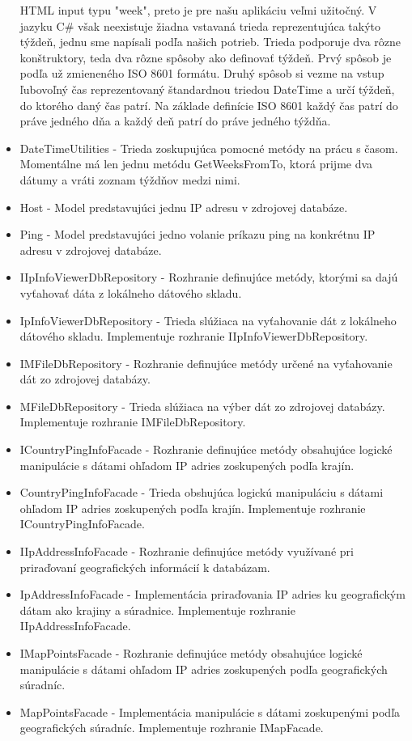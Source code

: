 \begin{itemize}
    HTML input typu "week", preto je pre našu aplikáciu veľmi užitočný. V jazyku C\# však neexistuje žiadna vstavaná trieda reprezentujúca takýto týždeň, jednu sme napísali 
    podľa našich potrieb. Trieda podporuje dva rôzne konštruktory, teda dva rôzne spôsoby ako definovať týždeň. Prvý spôsob je podľa už zmieneného ISO 8601 formátu. Druhý spôsob 
    si vezme na vstup ľubovoľný čas reprezentovaný štandardnou triedou DateTime a určí týždeň, do ktorého daný čas patrí. Na základe definície ISO 8601 každý čas patrí do práve jedného 
    dňa a každý deň patrí do práve jedného týždňa. 
    \item DateTimeUtilities
    - Trieda zoskupujúca pomocné metódy na prácu s časom. Momentálne má len jednu metódu GetWeeksFromTo, ktorá prijme dva dátumy a vráti zoznam týždňov 
    medzi nimi.
    \item Host
    - Model predstavujúci jednu IP adresu v zdrojovej databáze.
    \item Ping
    - Model predstavujúci jedno volanie príkazu ping na konkrétnu IP adresu v zdrojovej databáze.
    \item IIpInfoViewerDbRepository
    - Rozhranie definujúce metódy, ktorými sa dajú vyťahovať dáta z lokálneho dátového skladu. 
    \item IpInfoViewerDbRepository
    - Trieda slúžiaca na vyťahovanie dát z lokálneho dátového skladu. Implementuje rozhranie IIpInfoViewerDbRepository.
    \item IMFileDbRepository
    - Rozhranie definujúce metódy určené na vyťahovanie dát zo zdrojovej databázy.
    \item MFileDbRepository
    - Trieda slúžiaca na výber dát zo zdrojovej databázy. Implementuje rozhranie IMFileDbRepository.
    \item ICountryPingInfoFacade
    - Rozhranie definujúce metódy obsahujúce logické manipulácie s dátami ohľadom IP adries zoskupených podľa krajín.
    \item CountryPingInfoFacade
    - Trieda obshujúca logickú manipuláciu s dátami ohľadom IP adries zoskupených podľa krajín. Implementuje rozhranie ICountryPingInfoFacade.
    \item IIpAddressInfoFacade
    - Rozhranie definujúce metódy využívané pri priraďovaní geografických informácií k databázam.
    \item IpAddressInfoFacade
    - Implementácia priraďovania IP adries ku geografickým dátam ako krajiny a súradnice. Implementuje rozhranie IIpAddressInfoFacade.
    \item IMapPointsFacade
    - Rozhranie definujúce metódy obsahujúce logické manipulácie s dátami ohľadom IP adries zoskupených podľa geografických súradníc.
    \item MapPointsFacade
    - Implementácia manipulácie s dátami zoskupenými podľa geografických súradníc. Implementuje rozhranie IMapFacade.
\end{itemize}

